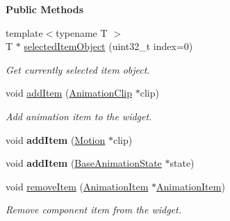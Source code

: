 \begin{Indent}\textbf{ Public Methods}\par
\begin{DoxyCompactItemize}
\item 
\mbox{\label{classrev_1_1_view_1_1_animation_tree_widget_af6513ee297355bbb7d85179523674aa6}} 
{\footnotesize template$<$typename T $>$ }\\T $\ast$ \mbox{\hyperlink{classrev_1_1_view_1_1_animation_tree_widget_af6513ee297355bbb7d85179523674aa6}{selected\+Item\+Object}} (uint32\+\_\+t index=0)
\begin{DoxyCompactList}\small\item\em Get currently selected item object. \end{DoxyCompactList}\item 
\mbox{\label{classrev_1_1_view_1_1_animation_tree_widget_a01b83d426a4bb3c25a11a004ecf5b2c5}} 
void \mbox{\hyperlink{classrev_1_1_view_1_1_animation_tree_widget_a01b83d426a4bb3c25a11a004ecf5b2c5}{add\+Item}} (\mbox{\hyperlink{classrev_1_1_animation_clip}{Animation\+Clip}} $\ast$clip)
\begin{DoxyCompactList}\small\item\em Add animation item to the widget. \end{DoxyCompactList}\item 
\mbox{\label{classrev_1_1_view_1_1_animation_tree_widget_ae3aa635314ec4f2da8cb397c102a0cfe}} 
void {\bfseries add\+Item} (\mbox{\hyperlink{classrev_1_1_motion}{Motion}} $\ast$clip)
\item 
\mbox{\label{classrev_1_1_view_1_1_animation_tree_widget_a16197751a5ef605c7ef746103d339f85}} 
void {\bfseries add\+Item} (\mbox{\hyperlink{classrev_1_1_base_animation_state}{Base\+Animation\+State}} $\ast$state)
\item 
\mbox{\label{classrev_1_1_view_1_1_animation_tree_widget_ad5d5d886b2548a3a09fd25a8d416bf36}} 
void \mbox{\hyperlink{classrev_1_1_view_1_1_animation_tree_widget_ad5d5d886b2548a3a09fd25a8d416bf36}{remove\+Item}} (\mbox{\hyperlink{classrev_1_1_view_1_1_animation_item}{Animation\+Item}} $\ast$\mbox{\hyperlink{classrev_1_1_view_1_1_animation_item}{Animation\+Item}})
\begin{DoxyCompactList}\small\item\em Remove component item from the widget. \end{DoxyCompactList}\end{DoxyCompactItemize}
\end{Indent}
